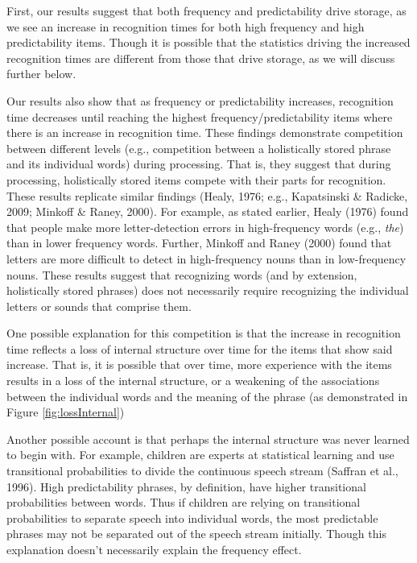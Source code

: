 \documentclass[
  man,floatsintext]{apa6}
\begin{document}
First, our results suggest that both frequency and predictability drive storage, as we see an increase in recognition times for both high frequency and high predictability items. Though it is possible that the statistics driving the increased recognition times are different from those that drive storage, as we will discuss further below.

Our results also show that as frequency or predictability increases, recognition time decreases until reaching the highest frequency/predictability items where there is an increase in recognition time. These findings demonstrate competition between different levels (e.g., competition between a holistically stored phrase and its individual words) during processing. That is, they suggest that during processing, holistically stored items compete with their parts for recognition. These results replicate similar findings (Healy, 1976; e.g., Kapatsinski \& Radicke, 2009; Minkoff \& Raney, 2000). For example, as stated earlier, Healy (1976) found that people make more letter-detection errors in high-frequency words (e.g., \emph{the}) than in lower frequency words. Further, Minkoff and Raney (2000) found that letters are more difficult to detect in high-frequency nouns than in low-frequency nouns. These results suggest that recognizing words (and by extension, holistically stored phrases) does not necessarily require recognizing the individual letters or sounds that comprise them.

One possible explanation for this competition is that the increase in recognition time reflects a loss of internal structure over time for the items that show said increase. That is, it is possible that over time, more experience with the items results in a loss of the internal structure, or a weakening of the associations between the individual words and the meaning of the phrase (as demonstrated in Figure \ref{fig:lossInternal})

Another possible account is that perhaps the internal structure was never learned to begin with. For example, children are experts at statistical learning and use transitional probabilities to divide the continuous speech stream (Saffran et al., 1996). High predictability phrases, by definition, have higher transitional probabilities between words. Thus if children are relying on transitional probabilities to separate speech into individual words, the most predictable phrases may not be separated out of the speech stream initially. Though this explanation doesn't necessarily explain the frequency effect.
\end{document}
